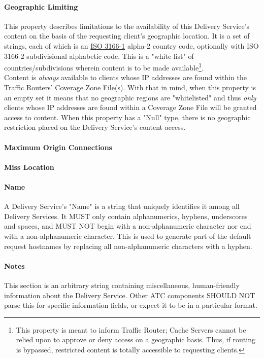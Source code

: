 \paragraph{Geographic Limiting}
This property describes limitations to the availability of this Delivery
Service's content on the basis of the requesting client's geographic location.
It is a set of strings, each of which is an
\href{https://www.iso.org/obp/ui/#search/code/}{ISO 3166-1} alpha-2 country
code, optionally with ISO 3166-2 subdivisional alphabetic code. This is a "white
list" of countries/subdivisions wherein content is to be made
available\footnote{This property is meant to inform Traffic Router; Cache
Servers cannot be relied upon to approve or deny access on a geographic basis.
Thus, if routing is bypassed, restricted content is totally accessible to
requesting clients.}.\\
Content is \emph{always} available to clients whose IP addresses are found
within the Traffic Routers' Coverage Zone File(s). With that in mind, when this
property is an empty set it means that no geographic regions are "whitelisted"
and thus \emph{only} clients whose IP addresses are found within a Coverage Zone
File will be granted access to content. When this property has a "Null" type,
there is no geographic restriction placed on the Delivery Service's content
access.

\paragraph{Maximum Origin Connections}


\paragraph{Miss Location}

\paragraph{Name}
A Delivery Service's "Name" is a string that uniquely identifies it among all
Delivery Services. It MUST only contain alphanumerics, hyphens, underscores and
spaces, and MUST NOT begin with a non-alphanumeric character nor end with a
non-alphanumeric character. This is used to generate part of the default request
hostnames by replacing all non-alphanumeric characters with a hyphen.

\paragraph{Notes}
This section is an arbitrary string containing miscellaneous, human-friendly
information about the Delivery Service. Other ATC components SHOULD NOT parse
this for specific information fields, or expect it to be in a particular format.

